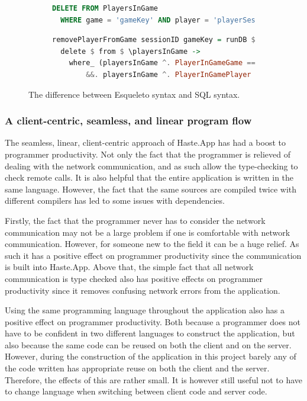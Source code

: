 \documentclass[a4paper]{article}
\begin{document}
\begin{figure}[h!]
\begin{subfigure}[]{\textwidth}
\begin{lstlisting}[language=SQL]
DELETE FROM PlayersInGame
  WHERE game = 'gameKey' AND player = 'playerSessionId';
\end{lstlisting}
\end{subfigure}

\begin{subfigure}[]{\textwidth}
\begin{lstlisting}[language=Haskell]
removePlayerFromGame sessionID gameKey = runDB $
  delete $ from $ \playersInGame ->
    where_ (playersInGame ^. PlayerInGameGame ==. val gameKey
        &&. playersInGame ^. PlayerInGamePlayer ==. val sessionID)
\end{lstlisting}
\end{subfigure}

\caption{The difference between Esqueleto syntax and SQL syntax.}
\label{fig:esqueleto-vs-sql}
\end{figure}


\subsubsection{A client-centric, seamless, and linear program flow}
The seamless, linear, client-centric approach of Haste.App has had a boost to programmer productivity. Not only the fact that the programmer is relieved of dealing with the network communication, and as such allow the type-checking to check remote calls. It is also helpful that the entire application is written in the same language. However, the fact that the same sources are compiled twice with different compilers has led to some issues with dependencies.

Firstly, the fact that the programmer never has to consider the network communication may not be a large problem if one is comfortable with network communication. However, for someone new to the field it can be a huge relief. As such it has a positive effect on programmer productivity since the communication is built into Haste.App. Above that, the simple fact that all network communication is type checked also has positive effects on programmer productivity since it removes confusing network errors from the application.

Using the same programming language throughout the application also has a positive effect on programmer productivity. Both because a programmer does not have to be confident in two different languages to construct the application, but also because the same code can be reused on both the client and on the server. However, during the construction of the application in this project barely any of the code written has appropriate reuse on both the client and the server. Therefore, the effects of this are rather small. It is however still useful not to have to change language when switching between client code and server code.
\end{document}
